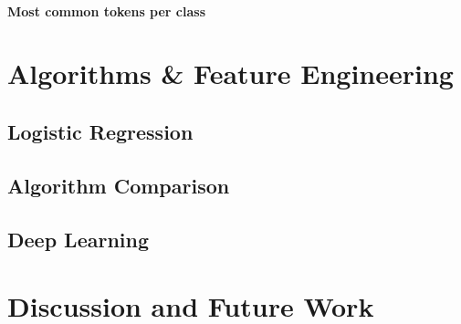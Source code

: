 \documentclass{article}
\begin{document}
	\paragraph{Most common tokens per class}
	
	
	
	
	

	
	\section{Algorithms \& Feature Engineering}
	\subsection{Logistic Regression}
	\subsection{Algorithm Comparison}
	\subsection{Deep Learning}
	\section{Discussion and Future Work}
\end{document}
